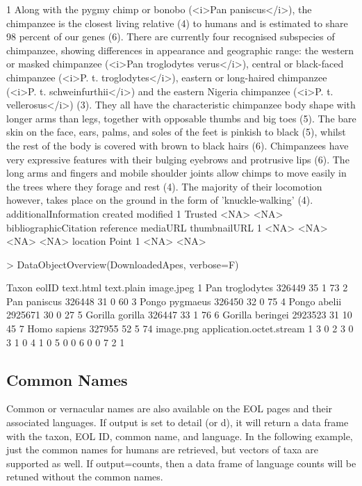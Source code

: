 \documentclass[12pt]{article}
\begin{document}
\begin{Schunk}
\begin{Soutput}
1 Along with the pygmy chimp or bonobo (<i>Pan paniscus</i>), the chimpanzee is the closest living relative (4) to humans and is estimated to share 98 percent of our genes (6). There are currently four recognised subspecies of chimpanzee, showing differences in appearance and geographic range: the western or masked chimpanzee (<i>Pan troglodytes verus</i>), central or black-faced chimpanzee (<i>P. t. troglodytes</i>), eastern or long-haired chimpanzee (<i>P. t. schweinfurthii</i>) and the eastern Nigeria chimpanzee (<i>P. t. vellerosus</i>) (3). They all have the characteristic chimpanzee body shape with longer arms than legs, together with opposable thumbs and big toes (5). The bare skin on the face, ears, palms, and soles of the feet is pinkish to black (5), whilst the rest of the body is covered with brown to black hairs (6). Chimpanzees have very expressive features with their bulging eyebrows and protrusive lips (6). The long arms and fingers and mobile shoulder joints allow chimps to move easily in the trees where they forage and rest (4). The majority of their locomotion however, takes place on the ground in the form of 'knuckle-walking' (4).
  additionalInformation created modified
1               Trusted    <NA>     <NA>
  bibliographicCitation reference mediaURL thumbnailURL
1                  <NA>      <NA>     <NA>         <NA>
  location Point
1     <NA>  <NA>
\end{Soutput}
\begin{Sinput}
> DataObjectOverview(DownloadedApes, verbose=F)
\end{Sinput}
\begin{Soutput}
             Taxon   eolID text.html text.plain image.jpeg
1  Pan troglodytes  326449        35          1         73
2     Pan paniscus  326448        31          0         60
3   Pongo pygmaeus  326450        32          0         75
4     Pongo abelii 2925671        30          0         27
5  Gorilla gorilla  326447        33          1         76
6 Gorilla beringei 2923523        31         10         45
7     Homo sapiens  327955        52          5         74
  image.png application.octet.stream
1         3                        0
2         3                        0
3         1                        0
4         1                        0
5         0                        0
6         0                        0
7         2                        1
\end{Soutput}
\end{Schunk}

\subsection{Common Names}
Common or vernacular names are also available on the EOL pages and their associated languages. If output is set to detail (or d), it will return a data frame with the taxon, EOL ID, common name, and language. In the following example, just the common names for humans are retrieved, but vectors of taxa are supported as well. If output=counts, then a data frame of language counts will be retuned without the common names.
\end{document}
